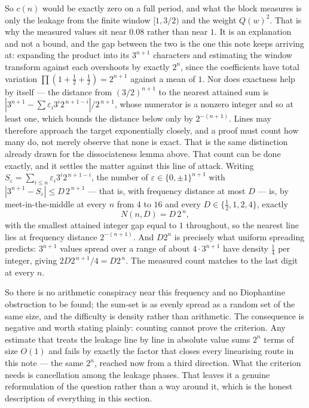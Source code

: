 \documentclass[11pt]{article}
\theoremstyle{remark}
\newcommand{\eps}{\varepsilon}
\begin{document}
So $c(n)$ would be exactly zero on a full period, and what the block measures is only the leakage from
the finite window $[1,3/2)$ and the weight $Q(w)^2$. That is why the measured values sit near $0.08$
rather than near $1$. It is an explanation and not a bound, and the gap between the two is the one this
note keeps arriving at: expanding the product into its $3^{n+1}$ characters and estimating the window
transform against each overshoots by exactly $2^n$, since the coefficients have total variation
$\prod(1+\tfrac12+\tfrac12)=2^{n+1}$ against a mean of $1$. Nor does exactness help by itself --- the
distance from $(3/2)^{n+1}$ to the nearest attained sum is
$|3^{n+1}-\sum\eps_i3^i2^{\,n+1-i}|/2^{\,n+1}$, whose numerator is a nonzero integer and so at least one,
which bounds the distance below only by $2^{-(n+1)}$. Lines may therefore approach the target
exponentially closely, and a proof must count how many do, not merely observe that none is exact. That is
the same distinction already drawn for the dissociateness lemma above.
That count can be done exactly, and it settles the matter against this line of attack. Writing
$S_\eps=\sum_{i\le n}\eps_i3^i2^{\,n+1-i}$, the number of $\eps\in\{0,\pm1\}^{n+1}$ with
$|3^{n+1}-S_\eps|\le D\,2^{\,n+1}$ --- that is, with frequency distance at most $D$ --- is, by
meet-in-the-middle at every $n$ from $4$ to $16$ and every $D\in\{\tfrac12,1,2,4\}$, exactly
\[
  N(n,D)=D\,2^{\,n},
\]
with the smallest attained integer gap equal to $1$ throughout, so the nearest line lies at frequency
distance $2^{-(n+1)}$. And $D2^n$ is precisely what uniform spreading predicts: $3^{n+1}$ values spread
over a range of about $4\cdot3^{n+1}$ have density $\tfrac14$ per integer, giving
$2D2^{\,n+1}/4=D2^{\,n}$. The measured count matches to the last digit at every $n$.

So there is no arithmetic conspiracy near this frequency and no Diophantine obstruction to be found; the
sum-set is as evenly spread as a random set of the same size, and the difficulty is density rather than
arithmetic. The consequence is negative and worth stating plainly: counting cannot prove the criterion.
Any estimate that treats the leakage line by line in absolute value sums $2^n$ terms of size $O(1)$ and
fails by exactly the factor that closes every linearising route in this note --- the same $2^n$, reached
now from a third direction. What the criterion needs is cancellation among the leakage phases. That
leaves it a genuine reformulation of the question rather than a way around it, which is the honest
description of everything in this section.
\end{document}
